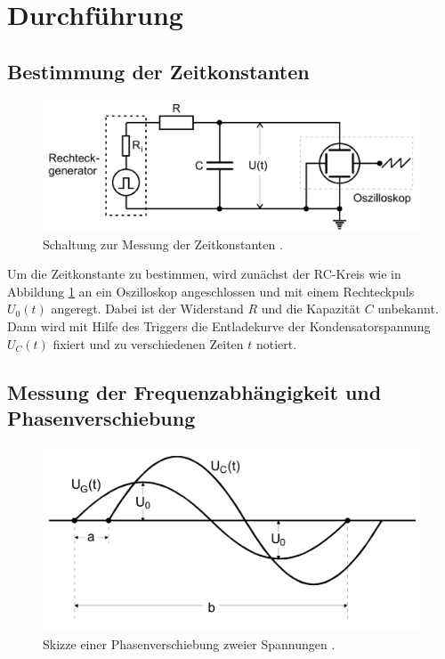 \section{Durchführung}
\label{sec:Durchführung}

\subsection{Bestimmung der Zeitkonstanten}
\begin{figure}
    \centering
    \includegraphics[width=\textwidth]{pictures/zeitkonstante.png}
    \caption{Schaltung zur Messung der Zeitkonstanten \cite{v353}.}
    \label{fig:zeitkonstante}
\end{figure}

Um die Zeitkonstante zu bestimmen, wird zunächst der RC-Kreis wie in Abbildung \ref{fig:zeitkonstante}
an ein Oszilloskop angeschlossen und mit einem Rechteckpuls $U_0 (t)$ angeregt.
Dabei ist der Widerstand $R$ und die Kapazität $C$ unbekannt.
Dann wird mit Hilfe des Triggers die Entladekurve der Kondensatorspannung $U_C (t)$ fixiert und
zu verschiedenen Zeiten $t$ notiert.

\subsection{Messung der Frequenzabhängigkeit und Phasenverschiebung}

\begin{figure}
    \centering
    \includegraphics[width=\textwidth]{pictures/Phasenverschiebung.png}
    \caption{Skizze einer Phasenverschiebung zweier Spannungen \cite{v353}.}
    \label{fig:phasenverschiebung}
\end{figure}

